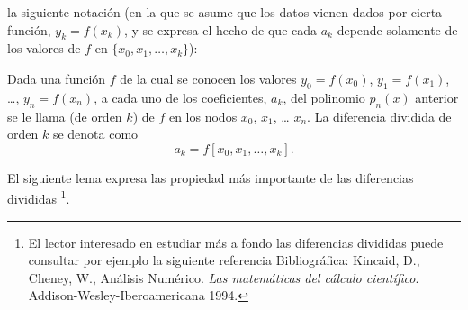  la siguiente notación (en la que se asume que los datos vienen dados
 por cierta función, $y_k=f(x_k)$, y se expresa el hecho de que cada
 $a_k$ depende solamente de los valores de $f$ en
 $\{x_0,x_1,\dots,x_k\}$):
 \begin{definition}
   Dada una función $f$ de la cual se conocen los valores $y_0=f(x_0)$,
   $y_1=f(x_1)$, \dots, $y_n=f(x_n)$, 
   a cada uno de los coeficientes, $a_k$, del polinomio $p_n(x)$
   anterior se le llama  (de orden $k$) de $f$ en los nodos $x_0$, $x_1$, \dots
   $x_n$. La diferencia dividida de orden $k$ se denota como
   $$
   a_k = f[x_0,x_1,\dots,x_k].
   $$
 \end{definition}

 El siguiente lema expresa las propiedad más importante de las
 diferencias divididas%
 \footnote{El lector interesado en estudiar más a fondo las
   diferencias divididas  puede consultar por ejemplo la
   siguiente referencia Bibliográfica: Kincaid, D., Cheney, W.,
   Análisis Numérico. \textit{Las matemáticas del cálculo
     científico}. Addison-Wesley-Iberoamericana 1994.}.



